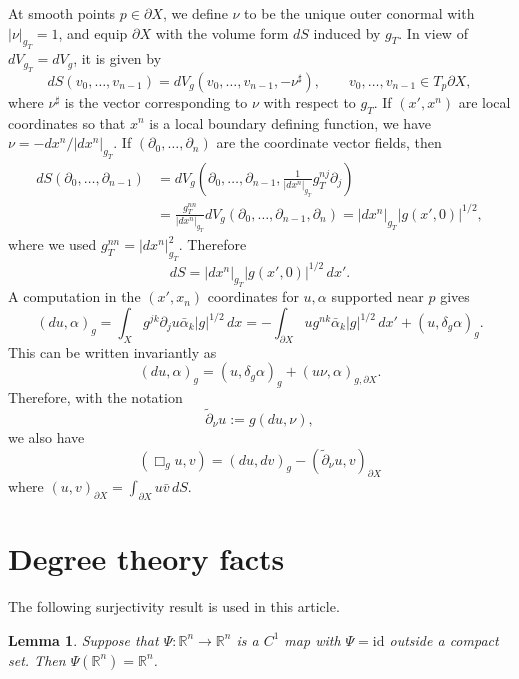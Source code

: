\documentclass[11pt,letterpaper]{amsart}
\newtheorem{Lemma}[Theorem]{Lemma}
\theoremstyle{definition}
\numberwithin{equation}{section}
\newcommand{\mR}{\mathbb{R}}                    %
\newcommand{\id}{\mathrm{id}}
\newcommand{\p}{\partial}
\def\p{\partial}
\def\R{\mathbb R}
\begin{document}
At smooth points $p \in \p X$, we define $\nu$ to be the unique outer conormal with $|\nu|_{g_T} = 1$, and equip $\p X$ with the volume form $dS$ induced by $g_T$. In view of $dV_{g_T} = dV_g$, it is given by 
\[
dS(v_0, \ldots, v_{n-1}) = dV_g(v_0, \ldots, v_{n-1}, -\nu^{\sharp}), \qquad v_0, \ldots, v_{n-1} \in T_p \p X,
\]
where $\nu^{\sharp}$ is the vector corresponding to $\nu$ with respect to $g_T$. If $(x',x^n)$ are local coordinates so that $x^n$ is a local boundary defining function, we have $\nu = -dx^n/|dx^n|_{g_T}$. If $(\p_0, \ldots, \p_n)$ are the coordinate vector fields, then 
    \begin{align*}
dS(\p_0, \ldots, \p_{n-1}) 
&= 
dV_g(\p_0, \ldots, \p_{n-1}, \frac{1}{|dx^n|_{g_T}} g_T^{nj} \p_j) 
\\&= 
\frac{g^{nn}_T}{|dx^n|_{g_T}} dV_g(\p_0, \ldots, \p_{n-1}, \p_n) 
= 
|dx^n|_{g_T} |g(x',0)|^{1/2},
    \end{align*}
where we used $g^{nn}_T = |dx^n|_{g_T}^2$. Therefore 
\begin{equation} \label{lorentzian_ds_expression}
dS = |dx^n|_{g_T} |g(x',0)|^{1/2} \,dx'.
\end{equation}
A computation in the $(x',x_n)$ coordinates for $u, \alpha$ supported near $p$ gives 
\[
(du, \alpha)_g = \int_X g^{jk} \p_j u \bar{\alpha}_k |g|^{1/2} \,dx = -\int_{\p X} u g^{nk} \bar{\alpha}_k |g|^{1/2} \,dx' + (u, \delta_g \alpha)_g.
\]
This can be written invariantly as 
\begin{equation*} %
(du, \alpha)_g = (u, \delta_g \alpha)_g + (u \nu, \alpha)_{g, \p X}.
\end{equation*}
Therefore, with the notation  
\[
\tilde{\p}_{\nu} u := g(du, \nu),
\]
we also have 
\begin{equation*} %
(\Box_g u, v) = (du, dv)_g - (\tilde{\p}_{\nu} u, v)_{\p X}
\end{equation*}
where $(u, v)_{\p X} = \int_{\p X} u \bar{v} \,dS$.




\section{Degree theory facts} \label{degree_theory}

The following surjectivity result is used in this article.

\begin{Lemma} \label{lemma_idext_surjective}
Suppose that $\Psi: \mR^n \to \mR^n$ is a $C^1$ map with $\Psi = \id$ outside a compact set. Then $\Psi(\R^n) = \R^n$.
\end{Lemma}
\end{document}
